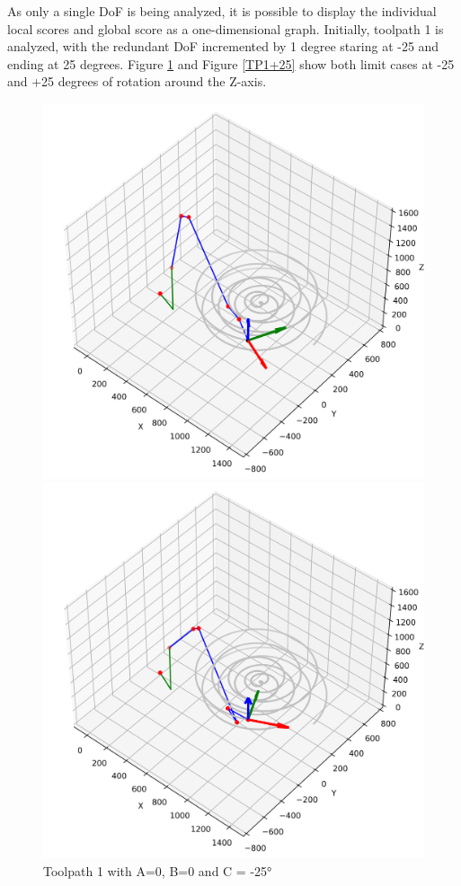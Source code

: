 As only a single DoF is being analyzed, it is possible to display the individual local scores and global score as a one-dimensional graph. Initially, toolpath 1 is analyzed, with the redundant DoF incremented by 1 degree staring at -25 and ending at 25 degrees. 
Figure \ref{TP1-25} and Figure \ref{TP1+25} show both limit cases at -25 and +25 degrees of rotation around the Z-axis.

\begin{figure}[H]
	\centering
	\begin{minipage}{0.5\textwidth}
		\includegraphics[width=\textwidth]{figures/robotANDpath1_-25.png}
		\caption{Toolpath 1 with A=0, B=0 and C = -25°}
		\label{TP1-25}
	\end{minipage}\hfill
	\begin{minipage}{0.5\textwidth}
		\includegraphics[width=\textwidth]{figures/robotANDpath1_25.png}

\end{minipage}
\end{figure}
